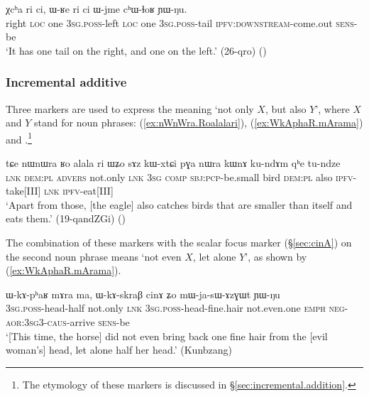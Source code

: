  \begin{exe}
\ex \label{ex:Xcha.ri.ci}
\gll   χcʰa ri ci, ɯ-ʁe ri ci ɯ-jme cʰɯ-ɬoʁ ɲɯ-ŋu. \\
right \textsc{loc} one  \textsc{3sg}.\textsc{poss}-left \textsc{loc} one \textsc{3sg}.\textsc{poss}-tail \textsc{ipfv}:\textsc{downstream}-come.out \textsc{sens}-be \\
\glt `It has one tail on the right, and one on the left.' (26-qro)
()
\end{exe}

 
    
 \subsubsection{Incremental additive} \label{sec:incremental.add.np} 
Three markers are used to express the meaning `not only $X$, but also $Y$', where $X$ and $Y$ stand for noun phrases:  (\ref{ex:nWnWra.Roalalari}),  (\ref{ex:WkAphaR.mArama}) and .\footnote{The etymology of these markers is discussed in §\ref{sec:incremental.addition}. } 

 \begin{exe}
\ex \label{ex:nWnWra.Roalalari}
 \gll tɕe nɯnɯra ʁo alala ri ɯʑo sɤz kɯ-xtɕi pɣa nɯra kɯnɤ ku-ndɤm qʰe tu-ndze \\
 \textsc{lnk} \textsc{dem}:\textsc{pl} \textsc{advers} not.only \textsc{lnk} \textsc{3sg} \textsc{comp} \textsc{sbj}:\textsc{pcp}-be.small bird \textsc{dem}:\textsc{pl} also \textsc{ipfv}-take[III] \textsc{lnk} \textsc{ipfv}-eat[III] \\
 \glt `Apart from those, [the eagle] also catches birds that are smaller than itself and eats them.' (19-qandZGi)
()
  \end{exe}

The combination of these markers with the scalar focus marker  (§\ref{sec:cinA}) on the second noun phrase means `not even $X$, let alone $Y$', as shown by (\ref{ex:WkAphaR.mArama}).


 \begin{exe}
\ex \label{ex:WkAphaR.mArama}
 \gll ɯ-kɤ-pʰaʁ mɤra ma, ɯ-kɤ-skraβ cinɤ ʑo mɯ-ja-sɯ-ɤzɣɯt ɲɯ-ŋu \\
 \textsc{3sg}.\textsc{poss}-head-half not.only \textsc{lnk} \textsc{3sg}.\textsc{poss}-head-fine.hair not.even.one \textsc{emph} \textsc{neg}-\textsc{aor}:\textsc{3sg}\fl{}3-\textsc{caus}-arrive \textsc{sens}-be \\
 \glt `[This time, the horse] did not even bring back one fine hair from the [evil woman's] head, let alone half her head.' (Kunbzang)
  \end{exe} 
  
